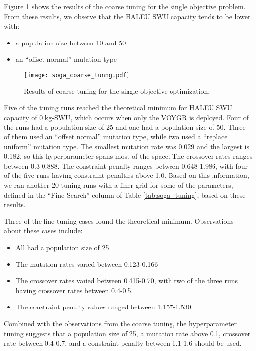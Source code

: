 Figure \ref{fig:soga_coarse_tuning} shows the results of the coarse tuning 
for the single objective problem. From these results, we observe that the 
\gls{HALEU} \gls{SWU} capacity tends to be lower with:
\begin{itemize}
    \item a population size between 10 and 50
    \item an ``offset normal'' mutation type
\end{itemize}

\begin{figure}
    \texttt{[image: soga\_coarse\_tunng.pdf]}
    \caption{Results of coarse tuning for the single-objective 
    optimization.}
    \label{fig:soga_coarse_tuning}
\end{figure}

Five of the tuning runs reached the theoretical minimum for \gls{HALEU} \gls{SWU} 
capacity of 0 kg-SWU, which occurs when only the VOYGR is deployed. Four of the 
runs had a population size of 25 and one had a population size of 50. Three of 
them used an ``offset normal'' mutation 
type, while two used a ``replace uniform'' mutation type. The smallest mutation 
rate was 0.029 and the largest is 0.182, so this hyperparameter spans most of 
the space. The crossover rates ranges between 0.3-0.888. The constraint 
penalty ranges between 0.648-1.986, with four of the five runs having constraint 
penalties above 1.0. Based on this information, we ran another 20 tuning runs with 
a finer grid for some of the parameters, defined in the ``Fine Search'' column of 
Table \ref{tab:soga_tuning}, based on these results. 

Three of the fine tuning cases found the theoretical minimum. Observations about 
these cases include:
\begin{itemize}
    \item All had a population size of 25
    \item The mutation rates varied between 0.123-0.166
    \item The crossover rates varied between 0.415-0.70, with two of the three 
          runs having crossover rates between 0.4-0.5
    \item The constraint penalty values ranged between 1.157-1.530
\end{itemize}
Combined with the observations from the coarse tuning, the hyperparameter 
tuning suggests that a population size of 25, a mutation rate above 
0.1, crossover rate between 0.4-0.7, and a constraint penalty 
between 1.1-1.6 should be used.  

